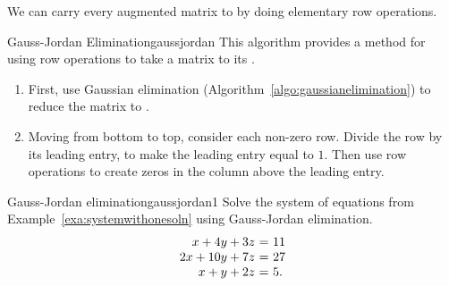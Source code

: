 We can carry every augmented matrix to {\rref} by doing elementary row
operations.

\begin{algorithm}{Gauss-Jordan Elimination}{gaussjordan}
  This algorithm provides a method for using row operations to take a
  matrix to its
  {\rref} .
  \begin{enumerate}
  \item First, use Gaussian elimination
    (Algorithm~\ref{algo:gaussianelimination}) to reduce the matrix to
    {\ef}.
  \item Moving from bottom to top, consider each non-zero row. Divide
    the row by its leading entry, to make the leading entry equal to
    $1$. Then use row operations to create zeros in the column above
    the leading entry.
  \end{enumerate}
\end{algorithm}

\begin{example}{Gauss-Jordan elimination}{gaussjordan1}
  Solve the system of equations from
  Example~\ref{exa:systemwithonesoln} using Gauss-Jordan elimination.
  \begin{equation*}
    \begin{array}{r@{~}c@{~}l}
      x+4y+3z &=& 11\\
      2x+10y+7z &=& 27\\
      x+y+2z &=& 5.
    \end{array}
  \end{equation*}
\end{example}

